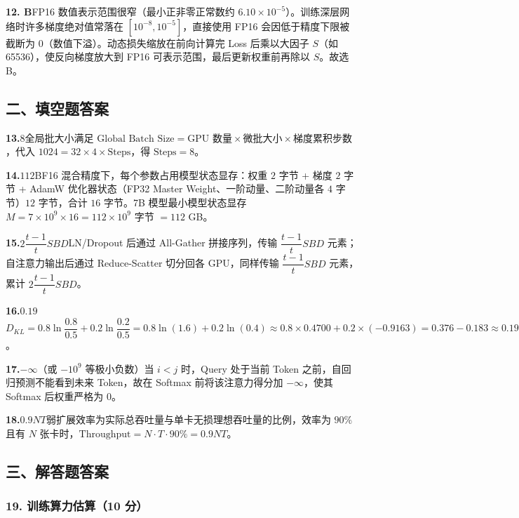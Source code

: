 \documentclass[11pt,a4paper]{article}
\begin{document}
\noindent\textbf{12. B}\quad FP16 数值表示范围很窄（最小正非零正常数约 $6.10\times10^{-5}$）。训练深层网络时许多梯度绝对值常落在 $[10^{-8},10^{-5}]$，直接使用 FP16 会因低于精度下限被截断为 0（数值下溢）。动态损失缩放在前向计算完 Loss 后乘以大因子 $S$（如 65536），使反向梯度放大到 FP16 可表示范围，最后更新权重前再除以 $S$。故选 B。

\subsection*{\heiti 二、填空题答案}

\noindent\textbf{13.}\quad $8$\quad 全局批大小满足 $\text{Global Batch Size}=\text{GPU 数量}\times\text{微批大小}\times\text{梯度累积步数}$，代入 $1024=32\times4\times\text{Steps}$，得 $\text{Steps}=8$。

\noindent\textbf{14.}\quad $112$\quad BF16 混合精度下，每个参数占用模型状态显存：权重 $2$ 字节 + 梯度 $2$ 字节 + AdamW 优化器状态（FP32 Master Weight、一阶动量、二阶动量各 $4$ 字节）$12$ 字节，合计 $16$ 字节。7B 模型最小模型状态显存 $M=7\times10^{9}\times16=112\times10^{9}$ 字节 $=112$ GB。

\noindent\textbf{15.}\quad $2\dfrac{t-1}{t}SBD$\quad LN/Dropout 后通过 All-Gather 拼接序列，传输 $\dfrac{t-1}{t}SBD$ 元素；自注意力输出后通过 Reduce-Scatter 切分回各 GPU，同样传输 $\dfrac{t-1}{t}SBD$ 元素，累计 $2\dfrac{t-1}{t}SBD$。

\noindent\textbf{16.}\quad $0.19$\quad $D_{KL}=0.8\ln\dfrac{0.8}{0.5}+0.2\ln\dfrac{0.2}{0.5}=0.8\ln(1.6)+0.2\ln(0.4)\approx0.8\times0.4700+0.2\times(-0.9163)=0.376-0.183\approx0.19$。

\noindent\textbf{17.}\quad $-\infty$（或 $-10^9$ 等极小负数）\quad 当 $i<j$ 时，Query 处于当前 Token 之前，自回归预测不能看到未来 Token，故在 Softmax 前将该注意力得分加 $-\infty$，使其 Softmax 后权重严格为 0。

\noindent\textbf{18.}\quad $0.9NT$\quad 弱扩展效率为实际总吞吐量与单卡无损理想吞吐量的比例，效率为 $90\%$ 且有 $N$ 张卡时，$\text{Throughput}=N\cdot T\cdot 90\%=0.9NT$。

\subsection*{\heiti 三、解答题答案}

\subsubsection*{19. 训练算力估算（10 分）}
\end{document}
